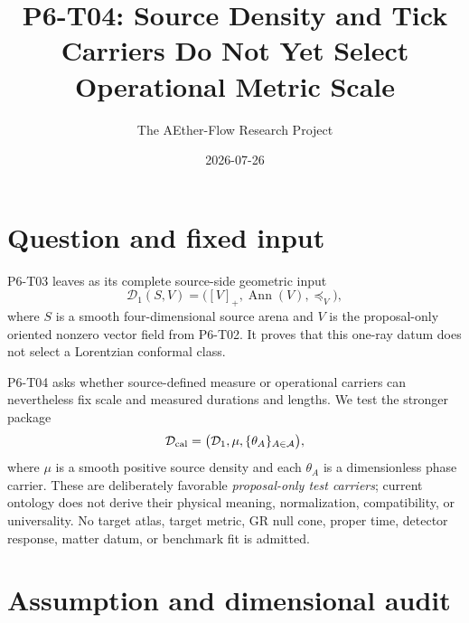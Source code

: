 \documentclass[11pt]{article}
\title{P6-T04: Source Density and Tick Carriers Do Not Yet Select Operational Metric Scale}
\author{The AEther-Flow Research Project}
\date{2026-07-26}
\newcommand{\Ann}{\operatorname{Ann}}
\begin{document}
\maketitle

\begin{center}
\end{center}

\section{Question and fixed input}

P6-T03 leaves as its complete source-side geometric input
\[
  \mathcal D_1(S,V)=\bigl([V]_+,\Ann(V),\preceq_V\bigr),
\]
where \(S\) is a smooth four-dimensional source arena and \(V\) is the
proposal-only oriented nonzero vector field from P6-T02.  It proves that this
one-ray datum does not select a Lorentzian conformal class.

P6-T04 asks whether source-defined measure or operational carriers can
nevertheless fix scale and measured durations and lengths.  We test the
stronger package
\[
 \mathcal D_{\rm cal}
 =\bigl(\mathcal D_1,\mu,\{\theta_A\}_{A\in\mathcal A}\bigr),
\]
where \(\mu\) is a smooth positive source density and each \(\theta_A\) is a
dimensionless phase carrier.  These are deliberately favorable
\emph{proposal-only test carriers}; current ontology does not derive their
physical meaning, normalization, compatibility, or universality.  No target
atlas, target metric, GR null cone, proper time, detector response, matter
datum, or benchmark fit is admitted.

\section{Assumption and dimensional audit}
\end{document}
